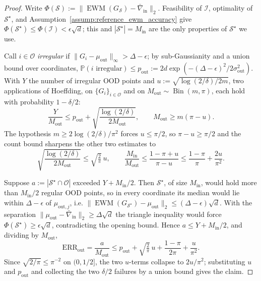 \documentclass[10pt,a4paper]{amsart}
\begin{document}
\begin{proof}
Write $\Phi(\mathcal S):=\|\operatorname{EWM}(G_{\mathcal S})-\bar\nabla_{\mathrm{in}}\|_2$. Feasibility
of $\mathcal I$, optimality of $\mathcal S^\star$, and Assumption~\ref{assump:reference_ewm_accuracy}
give $\Phi(\mathcal S^\star)\le\Phi(\mathcal I)<\epsilon\sqrt d$; this and $|\mathcal S^\star|=M_{\mathrm{in}}$
are the only properties of $\mathcal S^\star$ we use.

Call $i\in\mathcal O$ \emph{irregular} if $\|G_i-\mu_{\mathrm{out}}\|_\infty>\Delta-\epsilon$; by
sub-Gaussianity and a union bound over coordinates,
$\mathbb P(i\text{ irregular})\le p_{\mathrm{out}}:=2d\exp(-(\Delta-\epsilon)^2/2\sigma_{\mathrm{out}}^2)$.
With $Y$ the number of irregular OOD points and $u:=\sqrt{\log(2/\delta)/2m}$, two applications of
Hoeffding, on $\{G_i\}_{i\in\mathcal O}$ and on $M_{\mathrm{out}}\sim\operatorname{Bin}(m,\pi)$, each hold
with probability $1-\delta/2$:
\[
\frac{Y}{M_{\mathrm{out}}}\le p_{\mathrm{out}}+\sqrt{\frac{\log(2/\delta)}{2M_{\mathrm{out}}}},
\qquad
M_{\mathrm{out}}\ge m(\pi-u).
\]
The hypothesis $m\ge2\log(2/\delta)/\pi^2$ forces $u\le\pi/2$, so $\pi-u\ge\pi/2$ and the count bound
sharpens the other two estimates to
\[
\sqrt{\frac{\log(2/\delta)}{2M_{\mathrm{out}}}}\le\sqrt{\tfrac2\pi}\,u,
\qquad
\frac{M_{\mathrm{in}}}{M_{\mathrm{out}}}\le\frac{1-\pi+u}{\pi-u}\le\frac{1-\pi}{\pi}+\frac{2u}{\pi^2}.
\]

Suppose $a:=|\mathcal S^\star\cap\mathcal O|$ exceeded $Y+M_{\mathrm{in}}/2$. Then $\mathcal S^\star$, of size
$M_{\mathrm{in}}$, would hold more than $M_{\mathrm{in}}/2$ regular OOD points, so in every coordinate its
median would lie within $\Delta-\epsilon$ of $\mu_{\mathrm{out},j}$, i.e.
$\|\operatorname{EWM}(G_{\mathcal S^\star})-\mu_{\mathrm{out}}\|_2\le(\Delta-\epsilon)\sqrt d$. With the
separation $\|\mu_{\mathrm{out}}-\bar\nabla_{\mathrm{in}}\|_2\ge\Delta\sqrt d$ the triangle inequality would
force $\Phi(\mathcal S^\star)\ge\epsilon\sqrt d$, contradicting the opening bound. Hence
$a\le Y+M_{\mathrm{in}}/2$, and dividing by $M_{\mathrm{out}}$,
\[
\mathrm{ERR}_{\mathrm{out}}=\frac{a}{M_{\mathrm{out}}}
\le p_{\mathrm{out}}+\sqrt{\tfrac2\pi}\,u+\frac{1-\pi}{2\pi}+\frac{u}{\pi^2}.
\]
Since $\sqrt{2/\pi}\le\pi^{-2}$ on $(0,1/2]$, the two $u$-terms collapse to $2u/\pi^2$; substituting $u$
and $p_{\mathrm{out}}$ and collecting the two $\delta/2$ failures by a union bound gives the claim.
\end{proof}
\end{document}
